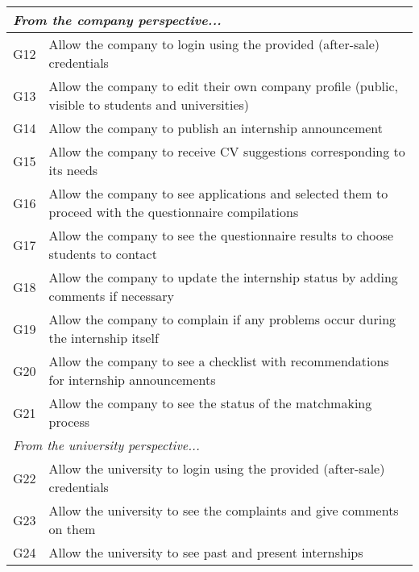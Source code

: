 \begin{table}[H]
\begin{longtable}{|l|p{}|}
        \hline
        \multicolumn{2}{|l|}{\textit{From the company perspective...}}                                                               \\
        \hline
        G12           & Allow the company to login using the provided (after-sale) credentials                                       \\
        \hline
        G13           & Allow the company to edit their own company profile (public, visible to students and universities)           \\
        \hline
        G14           & Allow the company to publish an internship announcement                                                      \\
        \hline
        G15           & Allow the company to receive CV suggestions corresponding to its needs                                       \\
        \hline
        G16           & Allow the company to see applications and selected them to proceed with the questionnaire compilations       \\
        \hline
        G17           & Allow the company to see the questionnaire results to choose students to contact                             \\
        \hline
        G18           & Allow the company to update the internship status by adding comments if necessary                            \\
        \hline
        G19           & Allow the company to complain if any problems occur during the internship itself                             \\
        \hline
        G20           & Allow the company to see a checklist with recommendations for internship announcements                       \\
        \hline
        G21           & Allow the company to see the status of the matchmaking process                                               \\
        \hline
        \multicolumn{2}{|l|}{\textit{From the university perspective...}}                                                            \\
        \hline
        G22           & Allow the university to login using the provided (after-sale) credentials                                    \\
        \hline
        G23           & Allow the university to see the complaints and give comments on them                                         \\
        \hline
        G24           & Allow the university to see past and present internships                                                     \\
        \hline
    \end{longtable}
\end{table}

